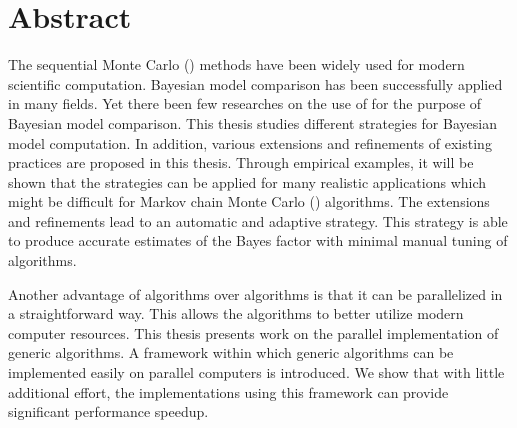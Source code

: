 \chapter*{Abstract}

The sequential Monte Carlo (\smc) methods have been widely used for modern
scientific computation. Bayesian model comparison has been successfully
applied in many fields. Yet there  been few researches on the use of \smc
for the purpose of Bayesian model comparison. This thesis studies different
\smc strategies for Bayesian model computation. In addition, various
extensions and refinements of existing \smc practices are proposed in this
thesis. Through empirical examples, it will be shown that the \smc strategies
can be applied for many realistic applications which might be difficult for
Markov chain Monte Carlo (\mcmc) algorithms. The extensions and refinements
lead to an automatic and adaptive strategy. This strategy is able to produce
accurate estimates of the Bayes factor with minimal manual tuning of
algorithms.

Another advantage of \smc algorithms over \mcmc algorithms is that it can be
parallelized in a straightforward way. This allows the algorithms to better
utilize modern computer resources. This thesis presents work on the parallel
implementation of generic \smc algorithms. A \cpp framework within which
generic \smc algorithms can be implemented easily on parallel computers is
introduced. We show that with little additional effort, the implementations
using this framework can provide significant performance speedup.
